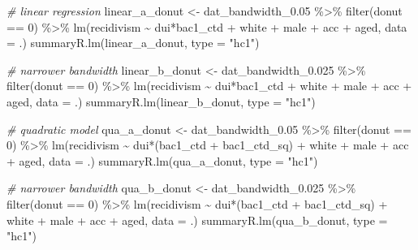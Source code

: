 \documentclass[
  11pt,
]{article}
\newenvironment{Shaded}{\begin{snugshade}}{\end{snugshade}}
\newcommand{\AttributeTok}[1]{\textcolor[rgb]{0.77,0.63,0.00}{#1}}
\newcommand{\CommentTok}[1]{\textcolor[rgb]{0.56,0.35,0.01}{\textit{#1}}}
\newcommand{\DecValTok}[1]{\textcolor[rgb]{0.00,0.00,0.81}{#1}}
\newcommand{\FloatTok}[1]{\textcolor[rgb]{0.00,0.00,0.81}{#1}}
\newcommand{\FunctionTok}[1]{\textcolor[rgb]{0.00,0.00,0.00}{#1}}
\newcommand{\NormalTok}[1]{#1}
\newcommand{\OtherTok}[1]{\textcolor[rgb]{0.56,0.35,0.01}{#1}}
\newcommand{\SpecialCharTok}[1]{\textcolor[rgb]{0.00,0.00,0.00}{#1}}
\newcommand{\StringTok}[1]{\textcolor[rgb]{0.31,0.60,0.02}{#1}}
\begin{document}
\begin{Shaded}
\begin{Highlighting}[]
\CommentTok{\# linear regression}
\NormalTok{linear\_a\_donut }\OtherTok{\textless{}{-}}
\NormalTok{  dat\_bandwidth\_0}\FloatTok{.05} \SpecialCharTok{\%\textgreater{}\%}
  \FunctionTok{filter}\NormalTok{(donut }\SpecialCharTok{==} \DecValTok{0}\NormalTok{) }\SpecialCharTok{\%\textgreater{}\%}
  \FunctionTok{lm}\NormalTok{(recidivism }\SpecialCharTok{\textasciitilde{}}\NormalTok{ dui}\SpecialCharTok{*}\NormalTok{bac1\_ctd }\SpecialCharTok{+}\NormalTok{ white }\SpecialCharTok{+}\NormalTok{ male }\SpecialCharTok{+}\NormalTok{ acc }\SpecialCharTok{+}\NormalTok{ aged,}
     \AttributeTok{data =}\NormalTok{ .)}
\FunctionTok{summaryR.lm}\NormalTok{(linear\_a\_donut, }\AttributeTok{type =} \StringTok{"hc1"}\NormalTok{)}

\CommentTok{\# narrower bandwidth}
\NormalTok{linear\_b\_donut }\OtherTok{\textless{}{-}}
\NormalTok{  dat\_bandwidth\_0}\FloatTok{.025} \SpecialCharTok{\%\textgreater{}\%}
  \FunctionTok{filter}\NormalTok{(donut }\SpecialCharTok{==} \DecValTok{0}\NormalTok{) }\SpecialCharTok{\%\textgreater{}\%}
  \FunctionTok{lm}\NormalTok{(recidivism }\SpecialCharTok{\textasciitilde{}}\NormalTok{ dui}\SpecialCharTok{*}\NormalTok{bac1\_ctd }\SpecialCharTok{+}\NormalTok{ white }\SpecialCharTok{+}\NormalTok{ male }\SpecialCharTok{+}\NormalTok{ acc }\SpecialCharTok{+}\NormalTok{ aged,}
     \AttributeTok{data =}\NormalTok{ .)}
\FunctionTok{summaryR.lm}\NormalTok{(linear\_b\_donut, }\AttributeTok{type =} \StringTok{"hc1"}\NormalTok{)}

\CommentTok{\# quadratic model}
\NormalTok{qua\_a\_donut }\OtherTok{\textless{}{-}}
\NormalTok{  dat\_bandwidth\_0}\FloatTok{.05} \SpecialCharTok{\%\textgreater{}\%}
  \FunctionTok{filter}\NormalTok{(donut }\SpecialCharTok{==} \DecValTok{0}\NormalTok{) }\SpecialCharTok{\%\textgreater{}\%}
  \FunctionTok{lm}\NormalTok{(recidivism }\SpecialCharTok{\textasciitilde{}}\NormalTok{ dui}\SpecialCharTok{*}\NormalTok{(bac1\_ctd }\SpecialCharTok{+}\NormalTok{ bac1\_ctd\_sq) }\SpecialCharTok{+}\NormalTok{ white }\SpecialCharTok{+}\NormalTok{ male }\SpecialCharTok{+}\NormalTok{ acc }\SpecialCharTok{+}\NormalTok{ aged,}
     \AttributeTok{data =}\NormalTok{ .)}
\FunctionTok{summaryR.lm}\NormalTok{(qua\_a\_donut, }\AttributeTok{type =} \StringTok{"hc1"}\NormalTok{)}

\CommentTok{\# narrower bandwidth}
\NormalTok{qua\_b\_donut }\OtherTok{\textless{}{-}}
\NormalTok{  dat\_bandwidth\_0}\FloatTok{.025} \SpecialCharTok{\%\textgreater{}\%}
  \FunctionTok{filter}\NormalTok{(donut }\SpecialCharTok{==} \DecValTok{0}\NormalTok{) }\SpecialCharTok{\%\textgreater{}\%}
  \FunctionTok{lm}\NormalTok{(recidivism }\SpecialCharTok{\textasciitilde{}}\NormalTok{ dui}\SpecialCharTok{*}\NormalTok{(bac1\_ctd }\SpecialCharTok{+}\NormalTok{ bac1\_ctd\_sq) }\SpecialCharTok{+}\NormalTok{ white }\SpecialCharTok{+}\NormalTok{ male }\SpecialCharTok{+}\NormalTok{ acc }\SpecialCharTok{+}\NormalTok{ aged,}
     \AttributeTok{data =}\NormalTok{ .)}
\FunctionTok{summaryR.lm}\NormalTok{(qua\_b\_donut, }\AttributeTok{type =} \StringTok{"hc1"}\NormalTok{)}
\end{Highlighting}
\end{Shaded}
\end{document}
